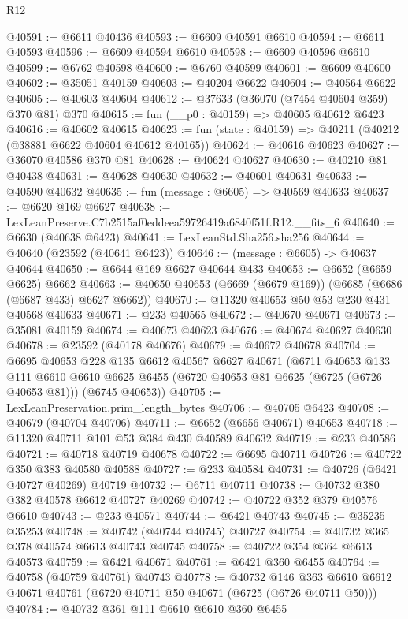 \begin{lexlean}{R12}
\begin{coremodule}
@40591 := @6611 @40436
@40593 := @6609 @40591 @6610
@40594 := @6611 @40593
@40596 := @6609 @40594 @6610
@40598 := @6609 @40596 @6610
@40599 := @6762 @40598
@40600 := @6760 @40599
@40601 := @6609 @40600
@40602 := @35051 @40159
@40603 := @40204 @6622
@40604 := @40564 @6622
@40605 := @40603 @40604
@40612 := @37633 (@36070 (@7454 @40604 @359) @370 @81) @370
@40615 := fun (__p0 : @40159) => @40605 @40612 @6423
@40616 := @40602 @40615
@40623 := fun (state : @40159) => @40211 (@40212 (@38881 @6622 @40604 @40612 @40165))
@40624 := @40616 @40623
@40627 := @36070 @40586 @370 @81
@40628 := @40624 @40627
@40630 := @40210 @81 @40438
@40631 := @40628 @40630
@40632 := @40601 @40631
@40633 := @40590 @40632
@40635 := fun (message : @6605) => @40569 @40633
@40637 := @6620 @169 @6627
@40638 := LexLeanPreserve.C7b2515af0eddeea59726419a6840f51f.R12.__fits_6
@40640 := @6630 (@40638 @6423)
@40641 := LexLeanStd.Sha256.sha256
@40644 := @40640 (@23592 (@40641 @6423))
@40646 := (message : @6605) -> @40637 @40644
@40650 := @6644 @169 @6627 @40644 @433
@40653 := @6652 (@6659 @6625) @6662
@40663 := @40650 @40653 (@6669 (@6679 @169)) (@6685 (@6686 (@6687 @433) @6627 @6662))
@40670 := @11320 @40653 @50 @53 @230 @431 @40568 @40633
@40671 := @233 @40565
@40672 := @40670 @40671
@40673 := @35081 @40159
@40674 := @40673 @40623
@40676 := @40674 @40627 @40630
@40678 := @23592 (@40178 @40676)
@40679 := @40672 @40678
@40704 := @6695
    @40653
    @228
    @135
    @6612
    @40567
    @6627
    @40671
    (@6711
      @40653
      @133
      @111
      @6610
      @6610
      @6625
      @6455
      (@6720 @40653 @81 @6625 (@6725 (@6726 @40653 @81)))
      (@6745 @40653))
@40705 := LexLeanPreservation.prim_length_bytes
@40706 := @40705 @6423
@40708 := @40679 (@40704 @40706)
@40711 := @6652 (@6656 @40671) @40653
@40718 := @11320 @40711 @101 @53 @384 @430 @40589 @40632
@40719 := @233 @40586
@40721 := @40718 @40719 @40678
@40722 := @6695 @40711
@40726 := @40722 @350 @383 @40580 @40588
@40727 := @233 @40584
@40731 := @40726 (@6421 @40727 @40269) @40719
@40732 := @6711 @40711
@40738 := @40732 @380 @382 @40578 @6612 @40727 @40269
@40742 := @40722 @352 @379 @40576 @6610
@40743 := @233 @40571
@40744 := @6421 @40743
@40745 := @35235 @35253
@40748 := @40742 (@40744 @40745) @40727
@40754 := @40732 @365 @378 @40574 @6613 @40743 @40745
@40758 := @40722 @354 @364 @6613 @40573
@40759 := @6421 @40671
@40761 := @6421 @360 @6455
@40764 := @40758 (@40759 @40761) @40743
@40778 := @40732
    @146
    @363
    @6610
    @6612
    @40671
    @40761
    (@6720 @40711 @50 @40671 (@6725 (@6726 @40711 @50)))
@40784 := @40732 @361 @111 @6610 @6610 @360 @6455

\end{coremodule}
\end{lexlean}
